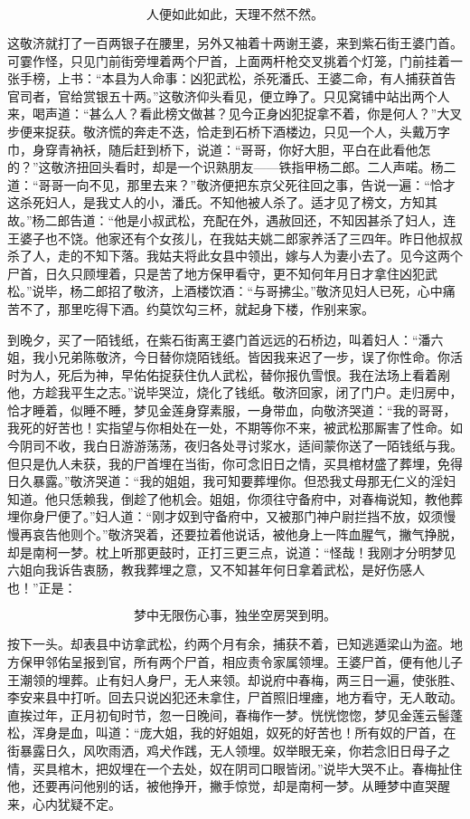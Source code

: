 \[
人便如此如此，天理不然不然。
\]

这敬济就打了一百两银子在腰里，另外又袖着十两谢王婆，来到紫石街王婆门首。可霎作怪，只见门前街旁埋着两个尸首，上面两杆枪交叉挑着个灯笼，门前挂着一张手榜，上书：“本县为人命事：凶犯武松，杀死潘氏、王婆二命，有人捕获首告官司者，官给赏银五十两。”这敬济仰头看见，便立睁了。只见窝铺中站出两个人来，喝声道：“甚么人？看此榜文做甚？见今正身凶犯捉拿不着，你是何人？”大叉步便来捉获。敬济慌的奔走不迭，恰走到石桥下酒楼边，只见一个人，头戴万字巾，身穿青衲袄，随后赶到桥下，说道：“哥哥，你好大胆，平白在此看他怎的？”这敬济扭回头看时，却是一个识熟朋友——铁指甲杨二郎。二人声喏。杨二道：“哥哥一向不见，那里去来？”敬济便把东京父死往回之事，告说一遍：“恰才这杀死妇人，是我丈人的小，潘氏。不知他被人杀了。适才见了榜文，方知其故。”杨二郎告道：“他是小叔武松，充配在外，遇赦回还，不知因甚杀了妇人，连王婆子也不饶。他家还有个女孩儿，在我姑夫姚二郎家养活了三四年。昨日他叔叔杀了人，走的不知下落。我姑夫将此女县中领出，嫁与人为妻小去了。见今这两个尸首，日久只顾埋着，只是苦了地方保甲看守，更不知何年月日才拿住凶犯武松。”说毕，杨二郎招了敬济，上酒楼饮酒：“与哥拂尘。”敬济见妇人已死，心中痛苦不了，那里吃得下酒。约莫饮勾三杯，就起身下楼，作别来家。

到晚夕，买了一陌钱纸，在紫石街离王婆门首远远的石桥边，叫着妇人：“潘六姐，我小兄弟陈敬济，今日替你烧陌钱纸。皆因我来迟了一步，误了你性命。你活时为人，死后为神，早佑佑捉获住仇人武松，替你报仇雪恨。我在法场上看着剐他，方趁我平生之志。”说毕哭泣，烧化了钱纸。敬济回家，闭了门户。走归房中，恰才睡着，似睡不睡，梦见金莲身穿素服，一身带血，向敬济哭道：“我的哥哥，我死的好苦也！实指望与你相处在一处，不期等你不来，被武松那厮害了性命。如今阴司不收，我白日游游荡荡，夜归各处寻讨浆水，适间蒙你送了一陌钱纸与我。但只是仇人未获，我的尸首埋在当街，你可念旧日之情，买具棺材盛了葬埋，免得日久暴露。”敬济哭道：“我的姐姐，我可知要葬埋你。但恐我丈母那无仁义的淫妇知道。他只恁赖我，倒趁了他机会。姐姐，你须往守备府中，对春梅说知，教他葬埋你身尸便了。”妇人道：“刚才奴到守备府中，又被那门神户尉拦挡不放，奴须慢慢再哀告他则个。”敬济哭着，还要拉着他说话，被他身上一阵血腥气，撇气挣脱，却是南柯一梦。枕上听那更鼓时，正打三更三点，说道：“怪哉！我刚才分明梦见六姐向我诉告衷肠，教我葬埋之意，又不知甚年何日拿着武松，是好伤感人也！”正是：

\[
梦中无限伤心事，独坐空房哭到明。
\]

按下一头。却表县中访拿武松，约两个月有余，捕获不着，已知逃遁梁山为盗。地方保甲邻佑呈报到官，所有两个尸首，相应责令家属领埋。王婆尸首，便有他儿子王潮领的埋葬。止有妇人身尸，无人来领。却说府中春梅，两三日一遍，使张胜、李安来县中打听。回去只说凶犯还未拿住，尸首照旧埋瘗，地方看守，无人敢动。直挨过年，正月初旬时节，忽一日晚间，春梅作一梦。恍恍惚惚，梦见金莲云髻蓬松，浑身是血，叫道：“庞大姐，我的好姐姐，奴死的好苦也！所有奴的尸首，在街暴露日久，风吹雨洒，鸡犬作践，无人领埋。奴举眼无亲，你若念旧日母子之情，买具棺木，把奴埋在一个去处，奴在阴司口眼皆闭。”说毕大哭不止。春梅扯住他，还要再问他别的话，被他挣开，撇手惊觉，却是南柯一梦。从睡梦中直哭醒来，心内犹疑不定。

